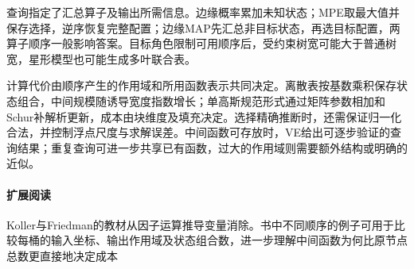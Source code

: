 查询指定了汇总算子及输出所需信息。边缘概率累加未知状态；MPE取最大值并保存选择，逆序恢复完整配置；边缘MAP先汇总非目标状态，再选目标配置，两算子顺序一般影响答案。目标角色限制可用顺序后，受约束树宽可能大于普通树宽，星形模型也可能生成多叶联合表。

计算代价由顺序产生的作用域和所用函数表示共同决定。离散表按基数乘积保存状态组合，中间规模随诱导宽度指数增长；单高斯规范形式通过矩阵参数相加和Schur补解析更新，成本由块维度及填充决定。选择精确推断时，还需保证归一化合法，并控制浮点尺度与求解误差。中间函数可存放时，VE给出可逐步验证的查询结果；重复查询可进一步共享已有函数，过大的作用域则需要额外结构或明确的近似。

\paragraph{扩展阅读}
Koller与Friedman的教材从因子运算推导变量消除。书中不同顺序的例子可用于比较每桶的输入坐标、输出作用域及状态组合数，进一步理解中间函数为何比原节点总数更直接地决定成本
